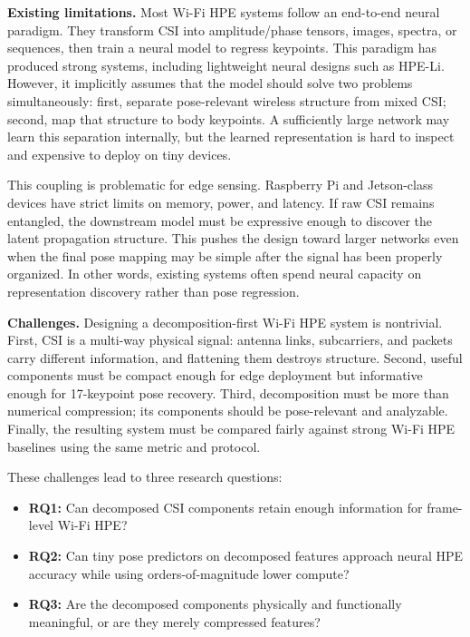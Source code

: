 \documentclass[letterpaper]{article}
\begin{document}
\textbf{Existing limitations.}
Most Wi-Fi HPE systems follow an end-to-end neural paradigm. They transform CSI into amplitude/phase tensors, images, spectra, or sequences, then train a neural model to regress keypoints. This paradigm has produced strong systems, including lightweight neural designs such as HPE-Li. However, it implicitly assumes that the model should solve two problems simultaneously: first, separate pose-relevant wireless structure from mixed CSI; second, map that structure to body keypoints. A sufficiently large network may learn this separation internally, but the learned representation is hard to inspect and expensive to deploy on tiny devices.

This coupling is problematic for edge sensing. Raspberry Pi and Jetson-class devices have strict limits on memory, power, and latency. If raw CSI remains entangled, the downstream model must be expressive enough to discover the latent propagation structure. This pushes the design toward larger networks even when the final pose mapping may be simple after the signal has been properly organized. In other words, existing systems often spend neural capacity on representation discovery rather than pose regression.

\textbf{Challenges.}
Designing a decomposition-first Wi-Fi HPE system is nontrivial. First, CSI is a multi-way physical signal: antenna links, subcarriers, and packets carry different information, and flattening them destroys structure. Second, useful components must be compact enough for edge deployment but informative enough for 17-keypoint pose recovery. Third, decomposition must be more than numerical compression; its components should be pose-relevant and analyzable. Finally, the resulting system must be compared fairly against strong Wi-Fi HPE baselines using the same metric and protocol.

These challenges lead to three research questions:
\begin{itemize}
    \item \textbf{RQ1:} Can decomposed CSI components retain enough information for frame-level Wi-Fi HPE?
    \item \textbf{RQ2:} Can tiny pose predictors on decomposed features approach neural HPE accuracy while using orders-of-magnitude lower compute?
    \item \textbf{RQ3:} Are the decomposed components physically and functionally meaningful, or are they merely compressed features?
\end{itemize}
\end{document}
